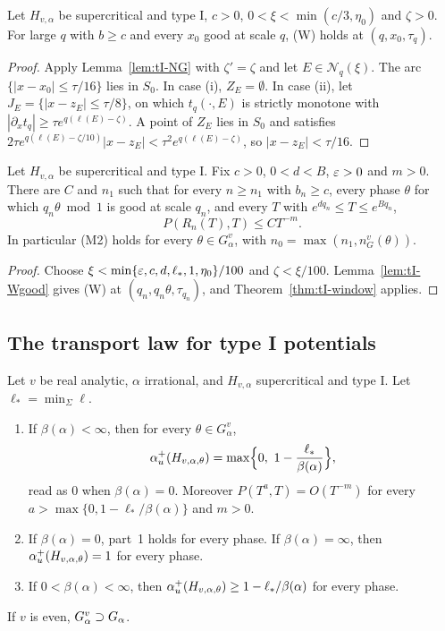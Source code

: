 \begin{lemma}\label{lem:tI-Wgood}
Let $H_{v,\alpha}$ be supercritical and type I, $c>0$, $0<\xi<\min(c/3,\eta_0)$ and $\zeta>0$. For large $q$ with $b\ge c$ and every $x_0$ good at scale $q$, (W) holds at $(q,x_0,\tau_q)$.
\end{lemma}

\begin{proof}
Apply Lemma~\ref{lem:tI-NG} with $\zeta'=\zeta$ and let $E\in\mathcal N_q(\xi)$. The arc $\{|x-x_0|\le\tau/16\}$ lies in $S_0$. In case (i), $Z_E=\emptyset$. In case (ii), let $J_E=\{|x-z_E|\le\tau/8\}$, on which $t_q(\cdot,E)$ is strictly monotone with $|\partial_xt_q|\ge\tau e^{q(\ell(E)-\zeta)}$. A point of $Z_E$ lies in $S_0$ and satisfies $2\tau e^{q(\ell(E)-\zeta/10)}|x-z_E|<\tau^2e^{q(\ell(E)-\zeta)}$, so $|x-z_E|<\tau/16$.
\end{proof}

\begin{theorem}\label{thm:tI-M2}
Let $H_{v,\alpha}$ be supercritical and type I. Fix $c>0$, $0<d<B$, $\varepsilon>0$ and $m>0$. There are $C$ and $n_1$ such that for every $n\ge n_1$ with $b_n\ge c$, every phase $\theta$ for which $q_n\theta\bmod1$ is good at scale $q_n$, and every $T$ with $e^{dq_n}\le T\le e^{Bq_n}$,
\[
P(R_n(T),T)\le CT^{-m}.
\]
In particular (M2) holds for every $\theta\in G^v_\alpha$, with $n_0=\max(n_1,n_G^v(\theta))$.
\end{theorem}

\begin{proof}
Choose $\xi<\min\{\varepsilon,c,d,\ell_*,1,\eta_0\}/100$ and $\zeta<\xi/100$. Lemma~\ref{lem:tI-Wgood} gives (W) at $(q_n,q_n\theta,\tau_{q_n})$, and Theorem~\ref{thm:tI-window} applies.
\end{proof}

\subsection{The transport law for type I potentials}\label{sec:tI-law}

\begin{theorem}\label{thm:tI-law}
Let $v$ be real analytic, $\alpha$ irrational, and $H_{v,\alpha}$ supercritical and type I. Let $\ell_*=\min_\Sigma\ell$.
\begin{enumerate}
\item If $\beta(\alpha)<\infty$, then for every $\theta\in G^v_\alpha$,
\[
\au(H_{v,\alpha,\theta})=\max\Bigl\{0,\ 1-\frac{\ell_*}{\beta(\alpha)}\Bigr\},
\]
read as $0$ when $\beta(\alpha)=0$. Moreover $P(T^a,T)=O(T^{-m})$ for every $a>\max\{0,1-\ell_*/\beta(\alpha)\}$ and $m>0$.
\item If $\beta(\alpha)=0$, part~1 holds for every phase. If $\beta(\alpha)=\infty$, then $\alpha_u^+(H_{v,\alpha,\theta})=1$ for every phase.
\item If $0<\beta(\alpha)<\infty$, then $\alpha_u^+(H_{v,\alpha,\theta})\ge1-\ell_*/\beta(\alpha)$ for every phase.
\end{enumerate}
If $v$ is even, $G^v_\alpha\supset G_\alpha$.
\end{theorem}

